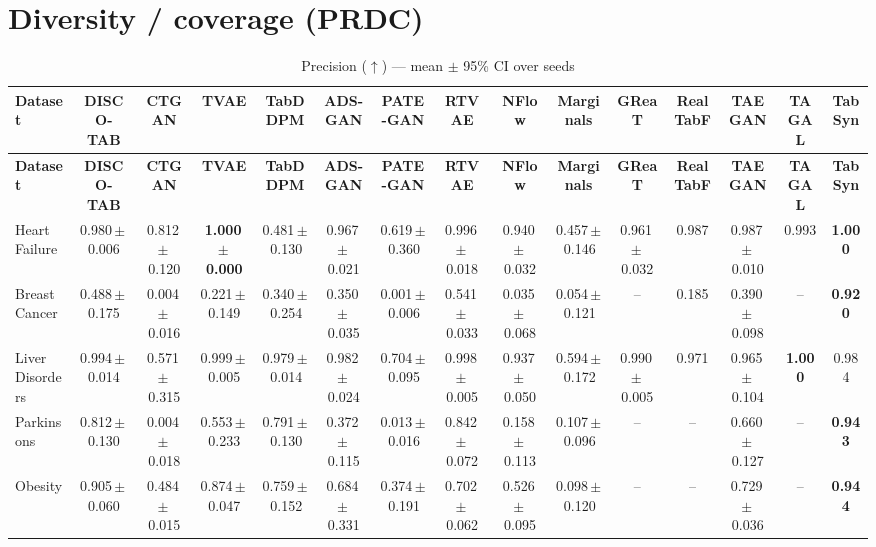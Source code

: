 \documentclass[8pt]{extarticle}
\begin{document}
\section*{Diversity / coverage (PRDC)}
\begin{longtable}{l*{14}{c}}
\caption{Precision ($\uparrow$) --- mean $\pm$ 95\% CI over seeds}\\
\toprule
\textbf{Dataset} & \textbf{DISCO-TAB} & \textbf{CTGAN} & \textbf{TVAE} & \textbf{TabDDPM} & \textbf{ADS-GAN} & \textbf{PATE-GAN} & \textbf{RTVAE} & \textbf{NFlow} & \textbf{Marginals} & \textbf{GReaT} & \textbf{RealTabF} & \textbf{TAEGAN} & \textbf{TAGAL} & \textbf{TabSyn} \\
\midrule
\endfirsthead
\toprule
\textbf{Dataset} & \textbf{DISCO-TAB} & \textbf{CTGAN} & \textbf{TVAE} & \textbf{TabDDPM} & \textbf{ADS-GAN} & \textbf{PATE-GAN} & \textbf{RTVAE} & \textbf{NFlow} & \textbf{Marginals} & \textbf{GReaT} & \textbf{RealTabF} & \textbf{TAEGAN} & \textbf{TAGAL} & \textbf{TabSyn} \\
\midrule
\endhead
\bottomrule
\endfoot
Heart Failure & 0.980\,$\pm$\,0.006 & 0.812\,$\pm$\,0.120 & \textbf{1.000\,$\pm$\,0.000} & 0.481\,$\pm$\,0.130 & 0.967\,$\pm$\,0.021 & 0.619\,$\pm$\,0.360 & 0.996\,$\pm$\,0.018 & 0.940\,$\pm$\,0.032 & 0.457\,$\pm$\,0.146 & 0.961\,$\pm$\,0.032 & 0.987 & 0.987\,$\pm$\,0.010 & 0.993 & \textbf{1.000} \\
Breast Cancer & 0.488\,$\pm$\,0.175 & 0.004\,$\pm$\,0.016 & 0.221\,$\pm$\,0.149 & 0.340\,$\pm$\,0.254 & 0.350\,$\pm$\,0.035 & 0.001\,$\pm$\,0.006 & 0.541\,$\pm$\,0.033 & 0.035\,$\pm$\,0.068 & 0.054\,$\pm$\,0.121 & -- & 0.185 & 0.390\,$\pm$\,0.098 & -- & \textbf{0.920} \\
Liver Disorders & 0.994\,$\pm$\,0.014 & 0.571\,$\pm$\,0.315 & 0.999\,$\pm$\,0.005 & 0.979\,$\pm$\,0.014 & 0.982\,$\pm$\,0.024 & 0.704\,$\pm$\,0.095 & 0.998\,$\pm$\,0.005 & 0.937\,$\pm$\,0.050 & 0.594\,$\pm$\,0.172 & 0.990\,$\pm$\,0.005 & 0.971 & 0.965\,$\pm$\,0.104 & \textbf{1.000} & 0.984 \\
Parkinsons & 0.812\,$\pm$\,0.130 & 0.004\,$\pm$\,0.018 & 0.553\,$\pm$\,0.233 & 0.791\,$\pm$\,0.130 & 0.372\,$\pm$\,0.115 & 0.013\,$\pm$\,0.016 & 0.842\,$\pm$\,0.072 & 0.158\,$\pm$\,0.113 & 0.107\,$\pm$\,0.096 & -- & -- & 0.660\,$\pm$\,0.127 & -- & \textbf{0.943} \\
Obesity & 0.905\,$\pm$\,0.060 & 0.484\,$\pm$\,0.015 & 0.874\,$\pm$\,0.047 & 0.759\,$\pm$\,0.152 & 0.684\,$\pm$\,0.331 & 0.374\,$\pm$\,0.191 & 0.702\,$\pm$\,0.062 & 0.526\,$\pm$\,0.095 & 0.098\,$\pm$\,0.120 & -- & -- & 0.729\,$\pm$\,0.036 & -- & \textbf{0.944} \\

\end{longtable}
\end{document}
